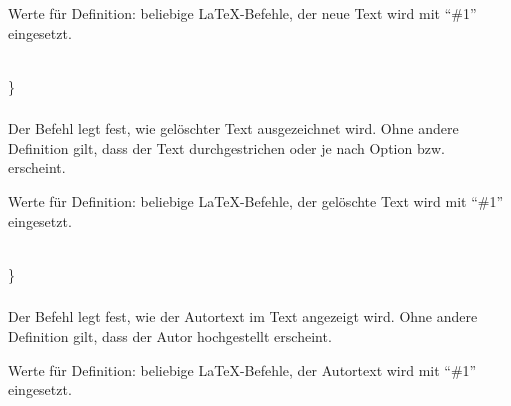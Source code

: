 Werte für Definition: beliebige \LaTeX-Befehle, der neue Text wird mit "`\#1"' eingesetzt.

\begin{chusage}
		\>\\
	\usageexample
		\>\}\\
		\>
\end{chusage}


\subsubsection{}
\DescribeMacro{\setdeletedmarkup}

Der Befehl  legt fest, wie gelöschter Text ausgezeichnet wird.
Ohne andere Definition gilt, dass der Text durchgestrichen oder je nach Option  bzw.\  erscheint.

Werte für Definition: beliebige \LaTeX-Befehle, der gelöschte Text wird mit "`\#1"' eingesetzt.

\begin{chusage}
		\>\\
	\usageexample
		\>\}\\
		\>
\end{chusage}


\subsubsection{}
\DescribeMacro{\setauthormarkup}

Der Befehl  legt fest, wie der Autortext im Text angezeigt wird.
Ohne andere Definition gilt, dass der Autor hochgestellt erscheint.

Werte für Definition: beliebige \LaTeX-Befehle, der Autortext wird mit "`\#1"' eingesetzt.

\begin{chusage}
		\>\\
	\usageexample
		\>\\
		\>\\
		\>
\end{chusage}


